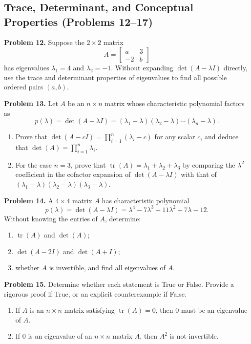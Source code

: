 \documentclass[11pt, letterpaper]{article}
\theoremstyle{definition}
\theoremstyle{remark}
\begin{document}
\subsection{Trace, Determinant, and Conceptual Properties (Problems 12--17)}

\noindent\textbf{Problem 12.} Suppose the $2 \times 2$ matrix
\[
A = \begin{bmatrix} a & 3 \\ -2 & b \end{bmatrix}
\]
has eigenvalues $\lambda_1 = 4$ and $\lambda_2 = -1$. Without expanding $\det(A - \lambda I)$ directly, use the trace and determinant properties of eigenvalues to find all possible ordered pairs $(a, b)$.

\noindent\textbf{Problem 13.} Let $A$ be an $n \times n$ matrix whose characteristic polynomial factors as
\[
p(\lambda) = \det(A - \lambda I) = (\lambda_1 - \lambda)(\lambda_2 - \lambda)\cdots(\lambda_n - \lambda).
\]
\begin{enumerate}[label=(\alph*), topsep=3pt, itemsep=3pt]
    \item Prove that $\det(A - cI) = \prod_{i=1}^{n} (\lambda_i - c)$ for any scalar $c$, and deduce that $\det(A) = \prod_{i=1}^{n} \lambda_i$.
    \item For the case $n = 3$, prove that $\operatorname{tr}(A) = \lambda_1 + \lambda_2 + \lambda_3$ by comparing the $\lambda^2$ coefficient in the cofactor expansion of $\det(A - \lambda I)$ with that of $(\lambda_1 - \lambda)(\lambda_2 - \lambda)(\lambda_3 - \lambda)$.
\end{enumerate}

\noindent\textbf{Problem 14.} A $4 \times 4$ matrix $A$ has characteristic polynomial
\[
p(\lambda) = \det(A - \lambda I) = \lambda^4 - 7\lambda^3 + 11\lambda^2 + 7\lambda - 12.
\]
Without knowing the entries of $A$, determine:
\begin{enumerate}[label=(\alph*), topsep=3pt, itemsep=3pt]
    \item $\operatorname{tr}(A)$ and $\det(A)$;
    \item $\det(A - 2I)$ and $\det(A + I)$;
    \item whether $A$ is invertible, and find all eigenvalues of $A$.
\end{enumerate}

\noindent\textbf{Problem 15.} Determine whether each statement is True or False. Provide a rigorous proof if True, or an explicit counterexample if False.
\begin{enumerate}[label=(\alph*), topsep=3pt, itemsep=3pt]
    \item If $A$ is an $n \times n$ matrix satisfying $\operatorname{tr}(A) = 0$, then $0$ must be an eigenvalue of $A$.
    \item If $0$ is an eigenvalue of an $n \times n$ matrix $A$, then $A^2$ is not invertible.
\end{enumerate}
\end{document}
